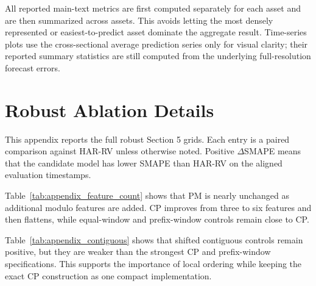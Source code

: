 ﻿\documentclass[a4paper]{article}
\begin{document}
\noindent
All reported main-text metrics are first computed separately for each asset and are then summarized across assets. This avoids letting the most densely represented or easiest-to-predict asset dominate the aggregate result. Time-series plots use the cross-sectional average prediction series only for visual clarity; their reported summary statistics are still computed from the underlying full-resolution forecast errors.

\section{Robust Ablation Details}

\noindent
This appendix reports the full robust Section 5 grids. Each entry is a paired comparison against HAR-RV unless otherwise noted. Positive $\Delta$SMAPE means that the candidate model has lower SMAPE than HAR-RV on the aligned evaluation timestamps.

\clearpage

{\renewcommand{\thetable}{C1}
\begin{center}
\label{tab:appendix_feature_count}
\scriptsize
\renewcommand{\arraystretch}{1.08}
\resizebox{0.86\textwidth}{!}{}
\end{center}}

\noindent
Table~\ref{tab:appendix_feature_count} shows that PM is nearly unchanged as additional modulo features are added. CP improves from three to six features and then flattens, while equal-window and prefix-window controls remain close to CP.

{\renewcommand{\thetable}{C2}
\begin{center}
\label{tab:appendix_contiguous}
\scriptsize
\renewcommand{\arraystretch}{1.08}
\resizebox{0.90\textwidth}{!}{}
\end{center}}

\noindent
Table~\ref{tab:appendix_contiguous} shows that shifted contiguous controls remain positive, but they are weaker than the strongest CP and prefix-window specifications. This supports the importance of local ordering while keeping the exact CP construction as one compact implementation.
\end{document}
